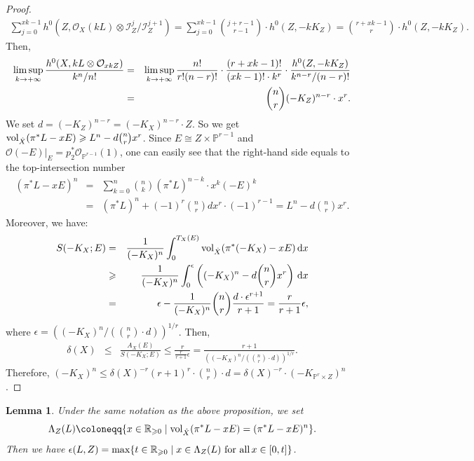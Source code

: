 \documentclass[12pt]{amsart}
\newtheorem{lem}[thm]{Lemma}
\theoremstyle{definition}
\def\max{{\rm max}}
\def\limsup{{\rm lim\,sup}}
\def\dif{{\rm d}}
\def\vol{{\rm vol}}
\newcommand{\IP}{{\mathbb P}}
\newcommand{\IR}{{\mathbb R}}
\newcommand{\CI}{{\mathcal I}}
\newcommand{\CO}{{\mathcal O}}
\newcommand{\lee}{\leqslant}
\newcommand{\gee}{\geqslant}
\begin{document}
\begin{proof}
\begin{eqnarray*}
    \sum_{j=0}^{xk-1}h^0(Z, \CO_X(kL)\otimes \CI_Z^j/\CI^{j+1}_Z) = \sum_{j=0}^{xk-1} \binom{j+r-1}{r-1}\cdot h^0(Z, -kK_Z) = \binom{r+xk-1}{r}\cdot h^0(Z, -kK_Z).
\end{eqnarray*}
Then,
\begin{eqnarray}\label{eq-h0}
    \mathop{\limsup}_{k\rightarrow +\infty} \frac{h^0(X,kL\otimes \CO_{xkZ})}{k^n/n!}&=&\mathop{\limsup}_{k\rightarrow +\infty}\frac{n!}{r!(n-r)!}\cdot\frac{(r+xk-1)!}{(xk-1)!\cdot k^r}\cdot\frac{h^0(Z,-kK_Z)}{k^{n-r}/(n-r)!} \nonumber \\
    &=&\binom{n}{r}(-K_Z)^{n-r}\cdot x^r.
\end{eqnarray}
We set $d = (-K_Z)^{n-r}=(-K_X)^{n-r}\cdot Z$. So we get $\vol_{\hat{X}}(\pi^*L-xE)\gee L^n - d \binom{n}{r}x^r$. 
Since $E\cong Z\times \IP^{r-1}$ and $\CO(-E)|_E=p_2^* \CO_{\IP^{r-1}}(1)$, one can easily see that the right-hand side equals to the top-intersection number 
\begin{eqnarray*}
    (\pi^*L-xE)^n &=& \sum_{k=0}^{n} \binom{n}{k} (\pi^*L)^{n-k}\cdot x^k(-E)^k\\
    &=&(\pi^*L)^n +(-1)^r \binom{n}{r} d x^r\cdot (-1)^{r-1}=L^n-d\binom{n}{r}x^r.
\end{eqnarray*}
Moreover, we have:
\begin{eqnarray*}
    S(-K_X;E) &=& \frac{1}{(-K_X)^n}\int_0^{T_X(E)} \vol_{\hat{X}}(\pi^*(-K_X)-xE) \,\dif x \\
    &\gee& \frac{1}{(-K_X)^n}\int_0^{\epsilon} \left((-K_X)^n - d\binom{n}{r}x^r\right) \,\dif x \\
    &=& \epsilon-\frac{1}{(-K_X)^n} \binom{n}{r} \frac{d\cdot \epsilon^{r+1}}{r+1} = \frac{r}{r+1}\epsilon,
\end{eqnarray*}
where $\epsilon = \left((-K_X)^n/(\binom{n}{r}\cdot d)\right)^{1/r}$. Then,
    \begin{eqnarray*}
        \delta(X) &\lee& \frac{A_X(E)}{S(-K_X;E)} \lee \frac{r}{\frac{r}{r+1}\epsilon} = \frac{r+1}{\left((-K_X)^n/(\binom{n}{r}\cdot d)\right)^{1/r}}.
    \end{eqnarray*}
     Therefore, $(-K_X)^n \lee \delta(X)^{-r}(r+1)^r\cdot \binom{n}{r}\cdot d = \delta(X)^{-r}\cdot (-K_{\IP^r\times Z})^n$.
\end{proof}
\begin{lem}\label{lem-seshadri}
    Under the same notation as the above proposition, we set 
    \begin{equation}\label{eq-LamZ}
    \Lambda_Z(L)\coloneqq \{x\in\IR_{\gee 0}\mid \vol_{\hat{X}}(\pi^*L-xE) = (\pi^*L-xE)^n\}.
    \end{equation}
    Then we have $\epsilon(L,Z) = \max\{t\in \IR_{\gee 0}\mid x\in \Lambda_Z(L) \,\, \text{for all}\, x\in[0,t]\}$.
\end{lem}
\end{document}
